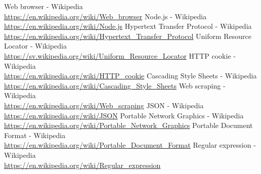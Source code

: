 \documentclass{article}
\begin{document}
	\newpage
	\renewcommand{\bibpreamble}{
		\textit{All sources were fetched on the date of publication of this paper. Because the information stated in the theory section (which is were the sources are referred from) of this paper is recognized as basic knowledge in the field, Wikipedia is considered a reliable source.}
	}
	\begin{thebibliography}{9}
		Web browser - Wikipedia\\\url{https://en.wikipedia.org/wiki/Web_browser}
		Node.js - Wikipedia\\\url{https://en.wikipedia.org/wiki/Node.js}
		Hypertext Transfer Protocol - Wikipedia\\\url{https://en.wikipedia.org/wiki/Hypertext_Transfer_Protocol}
		Uniform Resource Locator - Wikipedia\\\url{https://sv.wikipedia.org/wiki/Uniform_Resource_Locator}
		HTTP cookie - Wikipedia\\\url{https://en.wikipedia.org/wiki/HTTP_cookie}
		Cascading Style Sheets - Wikipedia\\\url{https://en.wikipedia.org/wiki/Cascading_Style_Sheets}
		Web scraping - Wikipedia\\\url{https://en.wikipedia.org/wiki/Web_scraping}
		JSON - Wikipedia\\\url{https://en.wikipedia.org/wiki/JSON}
		Portable Network Graphics - Wikipedia\\\url{https://en.wikipedia.org/wiki/Portable_Network_Graphics}
		Portable Document Format - Wikipedia\\\url{https://en.wikipedia.org/wiki/Portable_Document_Format}
		Regular expression - Wikipedia\\\url{https://en.wikipedia.org/wiki/Regular_expression}
	\end{thebibliography}
\end{document}
